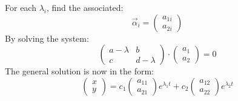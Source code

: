 \documentclass[12pt]{article}
\numberwithin{equation}{subsection}
\newcommand{\inda}{\hspace{.5cm}}
\begin{document}
For each $\lambda_i$, find the associated:
\begin{equation}
\vec{\alpha}_i=\begin{pmatrix}
a_{1i} \\
a_{2i}
\end{pmatrix}
\end{equation}
\inda By solving the system:
\begin{equation}
\begin{pmatrix}
a-\lambda & b \\
c & d-\lambda
\end{pmatrix} \cdot \begin{pmatrix}
a_1 \\
a_2
\end{pmatrix} =0
\end{equation}
The general solution is now in the form:
\begin{equation}
\begin{pmatrix}
x \\
y
\end{pmatrix}=c_1\begin{pmatrix}
a_{11} \\
a_{21}
\end{pmatrix}e^{\lambda_1 t}+c_2\begin{pmatrix}
a_{12} \\
a_{22}
\end{pmatrix}e^{\lambda_2 t} 
\end{equation}
\newpage
\end{document}
